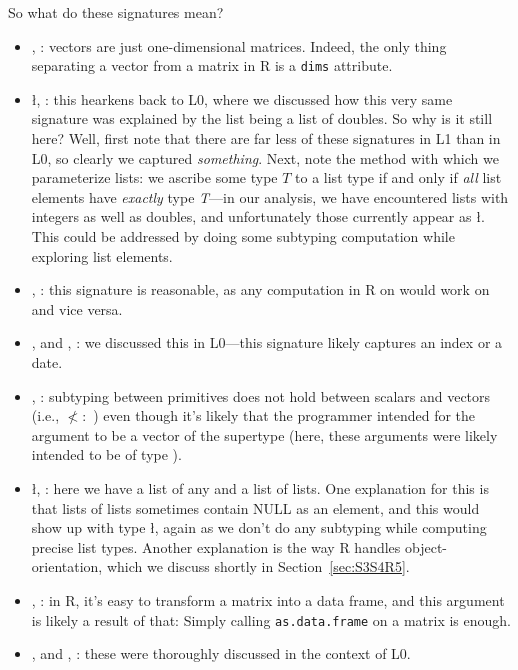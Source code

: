 \documentclass[acmsmall,10pt,review,anonymous]{acmart}\settopmatter{printfolios=true,printccs=false,printacmref=false}
\newcommand{\code}[1]{\lstinline|#1|\xspace}
\begin{document}
So what do these signatures mean?

\begin{itemize}
	\item \D, : vectors are just one-dimensional matrices.
	Indeed, the only thing separating a vector from a matrix in R is a {\tt dims} attribute.
	
	\item \l, : this hearkens back to L0, where we discussed how this very same signature was explained by the list being a list of doubles.
	So why is it still here?
	Well, first note that there are far less of these signatures in L1 than in L0, so clearly we captured {\it something}.
	Next, note the method with which we parameterize lists: we ascribe some type $T$ to a list type  if and only if {\it all} list elements have {\it exactly} type {\it T}---in our analysis, we have encountered lists with integers as well as doubles, and unfortunately those currently appear as \l.
	This could be addressed by doing some subtyping computation while exploring list elements.
	
	\item {}, : this signature is reasonable, as any computation in R on  would work on  and vice versa.
	
	\item \sC, \sD and \C, \D: we discussed this in L0---this signature likely captures an index or a date.
	
	\item \I, \sD: subtyping between primitives does not hold between scalars and vectors (i.e., \I $\not<:$ \sD) even though it's likely that the programmer intended for the argument to be a vector of the supertype (here, these arguments were likely intended to be of type \D).

	\item \l, : here we have a list of any and a list of lists.
	One explanation for this is that lists of lists sometimes contain NULL as an element, and this would show up with type \l, again as we don't do any subtyping while computing precise list types.
	Another explanation is the way R handles object-orientation, which we discuss shortly in Section~\ref{sec:S3S4R5}.
	
	\item \df, : in R, it's easy to transform a matrix into a data frame, and this argument is likely a result of that:
	Simply calling \code{as.data.frame} on a matrix is enough.
	
	\item \sD, \sF and \sC, \sF: these were thoroughly discussed in the context of L0.
	
\end{itemize}
\end{document}
